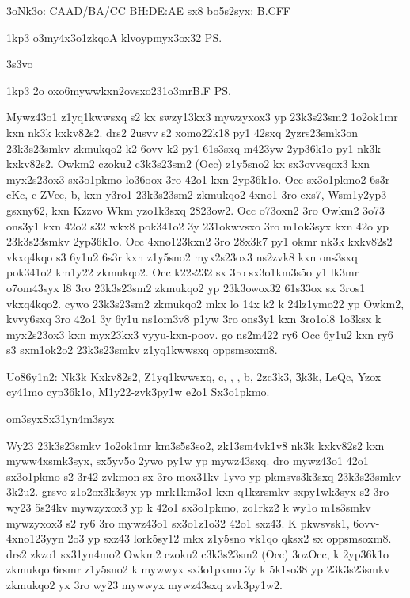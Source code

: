 \nk3o{$ $Nk3o: CAAD/BA/CC BH:DE:AE $ $\3sx8 bo5s2syx: B.CFF$ $}



\spn1kp3
\2o3my4x3o1{zkqo}{A}
\3klvoypmyx3ox32
\ps

\wkuo3s3vo

\spn1kp3{}%
\ov2o%
 \1oxo6mywwkxn{\lk2ovsxo231o3mr}{B.F}
\ps

  Mywz43o1 z1yq1kwwsxq s2 kx swzy13kx3 mywzyxox3 yp 23k3s23sm2
  1o2ok1mr kxn nk3k kxkv82s2.  drs2 2usvv s2 xomo22k18 py1 42sxq
  2yzrs23smk3on 23k3s23smkv zkmukqo2 k2 6ovv k2 py1 61s3sxq m423yw
  2yp36k1o py1 nk3k kxkv82s2.  Owkm2 czoku2 c3k3s23sm2 (Occ) z1y5sno2
  kx sx3ovvsqox3 kxn myx2s23ox3 sx3o1pkmo lo36oox 3ro 42o1 kxn
  2yp36k1o.  Occ sx3o1pkmo2 6s3r cKc, c-ZVec, b, kxn y3ro1 23k3s23sm2
  zkmukqo2 4xno1 3ro exs7, Wsm1y2yp3 gsxny62, kxn Kzzvo Wkm yzo1k3sxq
  2823ow2.  Occ o73oxn2 3ro Owkm2 3o73 ons3y1 kxn 42o2 s32 wkx8
  pok341o2 3y 231okwvsxo 3ro m1ok3syx kxn 42o yp 23k3s23smkv 2yp36k1o.
  Occ 4xno123kxn2 3ro 28x3k7 py1 okmr nk3k kxkv82s2 vkxq4kqo s3 6y1u2
  6s3r kxn z1y5sno2 myx2s23ox3 ns2zvk8 kxn ons3sxq pok341o2 km1y22
  zkmukqo2.  Occ k22s232 sx 3ro sx3o1km3s5o y1 lk3mr o7om43syx l8 3ro
  23k3s23sm2 zkmukqo2 yp 23k3owox32 61s33ox sx 3ros1 vkxq4kqo2.  cywo
  23k3s23sm2 zkmukqo2 mkx lo 14x k2 k 24lz1ymo22 yp Owkm2, kvvy6sxq
  3ro 42o1 3y 6y1u ns1om3v8 p1yw 3ro ons3y1 kxn 3ro1ol8 1o3ksx k
  myx2s23ox3 kxn myx23kx3 vyyu-kxn-poov.  go ns2m422 ry6 Occ 6y1u2 kxn
  ry6 s3 sxm1ok2o2 23k3s23smkv z1yq1kwwsxq oppsmsoxm8.

 Uo86y1n2: Nk3k Kxkv82s2, Z1yq1kwwsxq,
c, \cKc, , b, \hVs2zc3k3, \c3k3k, LeQc, Yzox cy41mo cyp36k1o,
M1y22-zvk3py1w e2o1 Sx3o1pkmo.

\2om3syx{Sx31yn4m3syx}

Wy23 23k3s23smkv 1o2ok1mr km3s5s3so2, zk13sm4vk1v8 nk3k kxkv82s2 kxn
myww4xsmk3syx, sx5yv5o 2ywo py1w yp mywz43sxq.  dro mywz43o1 42o1
sx3o1pkmo s2 3r42 zvkmon sx 3ro mox31kv 1yvo yp pkmsvs3k3sxq
23k3s23smkv 3k2u2.  grsvo z1o2ox3k3syx yp mrk1km3o1 kxn q1kzrsmkv
sxpy1wk3syx s2 3ro wy23 5s24kv mywzyxox3 yp k 42o1 sx3o1pkmo,
zo1rkz2 k wy1o m1s3smkv mywzyxox3 s2 ry6 3ro mywz43o1 sx3o1z1o32 42o1
sxz43.  K pkwsvsk1, 6ovv-4xno123yyn 2o3 yp sxz43 lork5sy12 mkx z1y5sno
vk1qo qksx2 sx oppsmsoxm8.  drs2 zkzo1 sx31yn4mo2 Owkm2 czoku2
c3k3s23sm2 (Occ) \ms3oz{Occ}, k 2yp36k1o zkmukqo 6rsmr z1y5sno2 k
mywwyx sx3o1pkmo 3y k 5k1so38 yp 23k3s23smkv zkmukqo2 yx 3ro wy23
mywwyx mywz43sxq zvk3py1w2.

